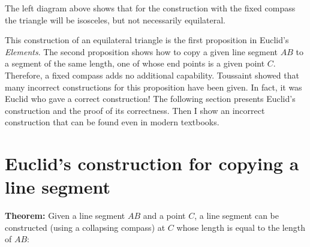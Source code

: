 The left diagram above shows that for the construction with the fixed compass the triangle will be isosceles, but not necessarily equilateral.

This construction of an equilateral triangle is the first proposition in Euclid's \emph{Elements}. The second proposition shows how to copy a given line segment $AB$ to a segment of the same length, one of whose end points is a given point $C$. Therefore, a fixed compass adds no additional capability. Toussaint \cite{toussaint} showed that many incorrect constructions for this proposition have been given. In fact, it was Euclid who gave a correct construction! The following section presents Euclid's construction and the proof of its correctness. Then I show an incorrect construction that can be found even in modern textbooks.

\section{Euclid's construction for copying a line segment}

\textbf{Theorem:} Given a line segment $AB$ and a point $C$, a line segment can be constructed (using a collapsing compass) at $C$ whose length is equal to the length of $AB$:

\vspace{-2ex}

\begin{center}
\end{center}

